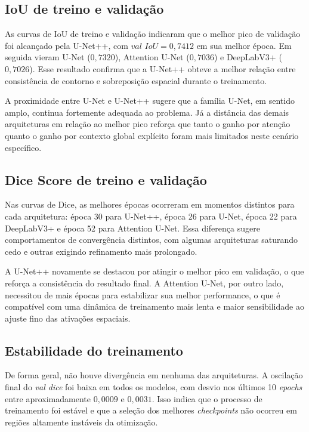 \documentclass[tcc,capa]{texufpel}
\begin{document}
\subsection{IoU de treino e validação}

As curvas de IoU de treino e validação indicaram que o melhor pico de validação foi alcançado pela U-Net++, com \(\textit{val IoU} = 0{,}7412\) em sua melhor época. Em seguida vieram U-Net (\(0{,}7320\)), Attention U-Net (\(0{,}7036\)) e DeepLabV3+ (\(0{,}7026\)). Esse resultado confirma que a U-Net++ obteve a melhor relação entre consistência de contorno e sobreposição espacial durante o treinamento.

A proximidade entre U-Net e U-Net++ sugere que a família U-Net, em sentido amplo, continua fortemente adequada ao problema. Já a distância das demais arquiteturas em relação ao melhor pico reforça que tanto o ganho por atenção quanto o ganho por contexto global explícito foram mais limitados neste cenário específico.

\subsection{Dice Score de treino e validação}

Nas curvas de Dice, as melhores épocas ocorreram em momentos distintos para cada arquitetura: época 30 para U-Net++, época 26 para U-Net, época 22 para DeepLabV3+ e época 52 para Attention U-Net. Essa diferença sugere comportamentos de convergência distintos, com algumas arquiteturas saturando cedo e outras exigindo refinamento mais prolongado.

A U-Net++ novamente se destacou por atingir o melhor pico em validação, o que reforça a consistência do resultado final. A Attention U-Net, por outro lado, necessitou de mais épocas para estabilizar sua melhor performance, o que é compatível com uma dinâmica de treinamento mais lenta e maior sensibilidade ao ajuste fino das ativações espaciais.

\subsection{Estabilidade do treinamento}

De forma geral, não houve divergência em nenhuma das arquiteturas. A oscilação final do \textit{val dice} foi baixa em todos os modelos, com desvio nos últimos 10 \textit{epochs} entre aproximadamente \(0{,}0009\) e \(0{,}0031\). Isso indica que o processo de treinamento foi estável e que a seleção dos melhores \textit{checkpoints} não ocorreu em regiões altamente instáveis da otimização.
\end{document}
